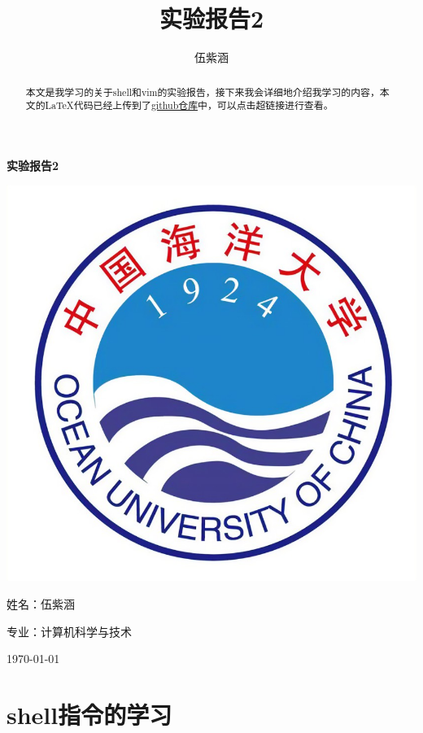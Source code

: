 \documentclass{article}
\title{实验报告2}
\author{伍紫涵}
\begin{document}
\renewcommand{\maketitle}{
    \begin{titlepage}
        \centering
        {\Huge\bfseries 实验报告2 \par}
        \vspace{2cm}
        \includegraphics[width=0.7\linewidth]{ouc.png} \par
        \vspace{2cm}
        {\LARGE 姓名：伍紫涵 \par}
        \vspace{1cm}
        {\LARGE 专业：计算机科学与技术 \par}
        \vspace{1cm}
        {\large \today \par}
    \end{titlepage}
}
\maketitle
\begin{titlepage}
\begin{abstract}
本文是我学习的关于shell和vim的实验报告，接下来我会详细地介绍我学习的内容，本文的LaTeX代码已经上传到了\href{https://github.com/qiqiqisi/Latex_Used.git}{github仓库}中，可以点击超链接进行查看。
\end{abstract}
{\hypersetup{hidelinks}\tableofcontents}
\end{titlepage}
\section{shell指令的学习}
\end{document}
